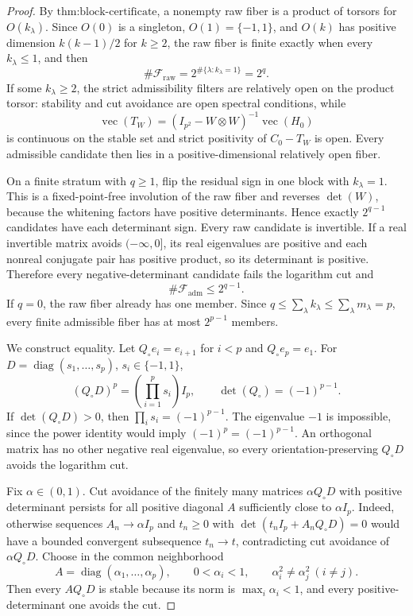 \documentclass{article}
\begin{document}
\begin{proof}
By \(\text{thm:block-certificate}\), a nonempty raw fiber is a product of torsors for \(O(k_\lambda)\).  Since \(O(0)\) is a singleton, \(O(1)=\{-1,1\}\), and \(O(k)\) has positive dimension \(k(k-1)/2\) for \(k\ge2\), the raw fiber is finite exactly when every \(k_\lambda\leq1\), and then
\[
 \#\mathcal F_{\mathrm{raw}}=2^{\#\{\lambda:k_\lambda=1\}}=2^q.
\]
If some \(k_\lambda\ge2\), the strict admissibility filters are relatively open on the product torsor: stability and cut avoidance are open spectral conditions, while
\[
 \operatorname{vec}(T_W)=(I_{p^2}-W\otimes W)^{-1}\operatorname{vec}(H_0)
\]
is continuous on the stable set and strict positivity of \(C_0-T_W\) is open.  Every admissible candidate then lies in a positive-dimensional relatively open fiber.

On a finite stratum with \(q\ge1\), flip the residual sign in one block with \(k_\lambda=1\).  This is a fixed-point-free involution of the raw fiber and reverses \(\det(W)\), because the whitening factors have positive determinants.  Hence exactly \(2^{q-1}\) candidates have each determinant sign.  Every raw candidate is invertible.  If a real invertible matrix avoids \(( -\infty,0]\), its real eigenvalues are positive and each nonreal conjugate pair has positive product, so its determinant is positive.  Therefore every negative-determinant candidate fails the logarithm cut and
\[
 \#\mathcal F_{\mathrm{adm}}\leq2^{q-1}.
\]
If \(q=0\), the raw fiber already has one member.  Since \(q\leq\sum_\lambda k_\lambda\leq\sum_\lambda m_\lambda=p\), every finite admissible fiber has at most \(2^{p-1}\) members.

We construct equality.  Let \(Q_\circ e_i=e_{i+1}\) for \(i<p\) and \(Q_\circ e_p=e_1\).  For \(D=\operatorname{diag}(s_1,\ldots,s_p)\), \(s_i\in\{-1,1\}\),
\[
 (Q_\circ D)^p=\left(\prod_{i=1}^ps_i\right)I_p,\qquad
 \det(Q_\circ)=(-1)^{p-1}.
\]
If \(\det(Q_\circ D)>0\), then \(\prod_i s_i=(-1)^{p-1}\).  The eigenvalue \(-1\) is impossible, since the power identity would imply \((-1)^p=(-1)^{p-1}\).  An orthogonal matrix has no other negative real eigenvalue, so every orientation-preserving \(Q_\circ D\) avoids the logarithm cut.

Fix \(\alpha\in(0,1)\).  Cut avoidance of the finitely many matrices \(\alpha Q_\circ D\) with positive determinant persists for all positive diagonal \(A\) sufficiently close to \(\alpha I_p\).  Indeed, otherwise sequences \(A_n\to\alpha I_p\) and \(t_n\ge0\) with \(\det(t_nI_p+A_nQ_\circ D)=0\) would have a bounded convergent subsequence \(t_n\to t\), contradicting cut avoidance of \(\alpha Q_\circ D\).  Choose in the common neighborhood
\[
 A=\operatorname{diag}(\alpha_1,\ldots,\alpha_p),\qquad
 0<\alpha_i<1,\qquad \alpha_i^2\ne\alpha_j^2\ (i\ne j).
\]
Then every \(AQ_\circ D\) is stable because its norm is \(\max_i\alpha_i<1\), and every positive-determinant one avoids the cut.


\end{proof}
\end{document}
